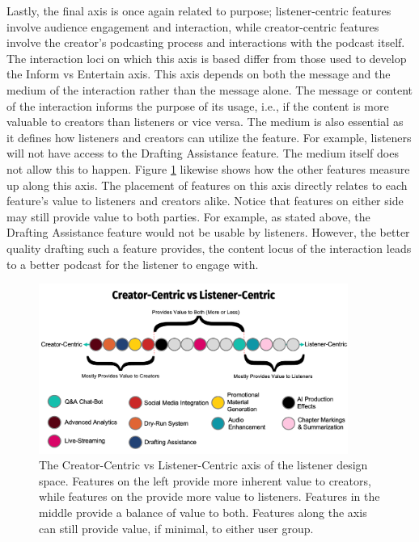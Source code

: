 \documentclass[12pt]{report}
\begin{document}
\begin{myfont}
        Lastly, the final axis is once again related to purpose; listener-centric features involve audience engagement and interaction, while creator-centric features involve the creator's podcasting process and interactions with the podcast itself. The interaction loci on which this axis is based differ from those used to develop the Inform vs Entertain axis. This axis depends on both the message and the medium of the interaction rather than the message alone. The message or content of the interaction informs the purpose of its usage, i.e., if the content is more valuable to creators than listeners or vice versa. The medium is also essential as it defines how listeners and creators can utilize the feature. For example, listeners will not have access to the Drafting Assistance feature. The medium itself does not allow this to happen. Figure \ref{fig:creatorcentricvslistenercentric} likewise shows how the other features measure up along this axis. The placement of features on this axis directly relates to each feature's value to listeners and creators alike. Notice that features on either side may still provide value to both parties. For example, as stated above, the Drafting Assistance feature would not be usable by listeners. However, the better quality drafting such a feature provides, the content locus of the interaction leads to a better podcast for the listener to engage with. 

        \begin{figure}[H]
            \centering
              \includegraphics[width=0.9\textwidth]{figures/creatorcentricvslistenercentric.png}
              \caption{The Creator-Centric vs Listener-Centric axis of the listener design space. Features on the left provide more inherent value to creators, while features on the provide more value to listeners. Features in the middle provide a balance of value to both. Features along the axis can still provide value, if minimal, to either user group.}
              \label{fig:creatorcentricvslistenercentric}
        \end{figure}


\end{myfont}
\end{document}
